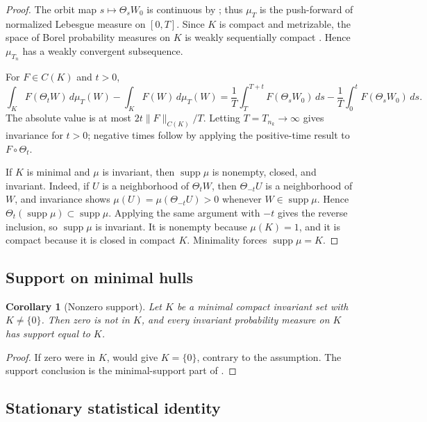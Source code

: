 \documentclass[11pt]{amsart}
\theoremstyle{plain}
\newtheorem{corollary}[corollary]{Corollary}
\theoremstyle{definition}
\theoremstyle{remark}
\numberwithin{equation}{section}
\newcommand{\supp}{\operatorname{supp}}
\begin{document}
\begin{proof}
The orbit map \(s\mapsto\Theta_sW_0\) is continuous by
; thus \(\mu_T\) is the push-forward of normalized
Lebesgue measure on \([0,T]\).  Since \(K\) is compact and metrizable, the
space of Borel probability measures on \(K\) is weakly sequentially compact
\cite{Billingsley1999}.  Hence \(\mu_{T_n}\) has a weakly convergent
subsequence.

For \(F\in C(K)\) and \(t>0\),
\[
   \int_K F(\Theta_tW)\,d\mu_T(W)-\int_KF(W)\,d\mu_T(W)
   =
   \frac1T\int_T^{T+t}F(\Theta_sW_0)\,ds
   -
   \frac1T\int_0^tF(\Theta_sW_0)\,ds .
\]
The absolute value is at most \(2t\|F\|_{C(K)}/T\).  Letting
\(T=T_{n_k}\to\infty\) gives invariance for \(t>0\); negative times follow by
applying the positive-time result to \(F\circ\Theta_t\).

If \(K\) is minimal and \(\mu\) is invariant, then \(\supp\mu\) is nonempty,
closed, and invariant.  Indeed, if \(U\) is a neighborhood of
\(\Theta_tW\), then \(\Theta_{-t}U\) is a neighborhood of \(W\), and invariance
shows \(\mu(U)=\mu(\Theta_{-t}U)>0\) whenever \(W\in\supp\mu\).  Hence
\(\Theta_t(\supp\mu)\subset\supp\mu\).  Applying the same argument with
\(-t\) gives the reverse inclusion, so \(\supp\mu\) is invariant.  It is
nonempty because \(\mu(K)=1\), and it is compact because it is closed in
compact \(K\).  Minimality forces \(\supp\mu=K\).
\end{proof}

\subsection{Support on minimal hulls}

\begin{corollary}[Nonzero support]\label{p2:cor:nonzero-support}
Let \(K\) be a minimal compact invariant set with \(K\ne\{0\}\).  Then zero is
not in \(K\), and every invariant probability measure on \(K\) has support
equal to \(K\).
\end{corollary}

\begin{proof}
If zero were in \(K\),  would give \(K=\{0\}\),
contrary to the assumption.  The support conclusion is the minimal-support part
of .
\end{proof}

\subsection{Stationary statistical identity}
\end{document}

